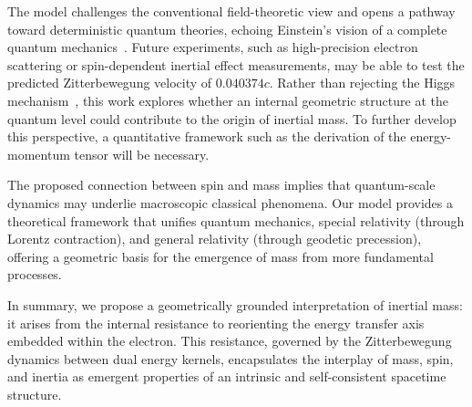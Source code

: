 \documentclass[%
 reprint,
 amsmath,amssymb,
 aps,
]{revtex4-1}
\numberwithin{equation}{section}%
\begin{document}
The model challenges the conventional field-theoretic view and opens a pathway toward deterministic quantum theories, echoing Einstein’s vision of a complete quantum mechanics~\cite{einstein1935}. Future experiments, such as high-precision electron scattering or spin-dependent inertial effect measurements, may be able to test the predicted Zitterbewegung velocity of $0.040374c$. Rather than rejecting the Higgs mechanism~\cite{higgs1964}, this work explores whether an internal geometric structure at the quantum level could contribute to the origin of inertial mass. To further develop this perspective, a quantitative framework such as the derivation of the energy-momentum tensor will be necessary.

The proposed connection between spin and mass implies that quantum-scale dynamics may underlie macroscopic classical phenomena. Our model provides a theoretical framework that unifies quantum mechanics, special relativity (through Lorentz contraction), and general relativity (through geodetic precession), offering a geometric basis for the emergence of mass from more fundamental processes.

In summary, we propose a geometrically grounded interpretation of inertial mass:  
it arises from the internal resistance to reorienting the energy transfer axis embedded within the electron.  
This resistance, governed by the Zitterbewegung dynamics between dual energy kernels, encapsulates the interplay of mass, spin, and inertia as emergent properties of an intrinsic and self-consistent spacetime structure.
\end{document}
